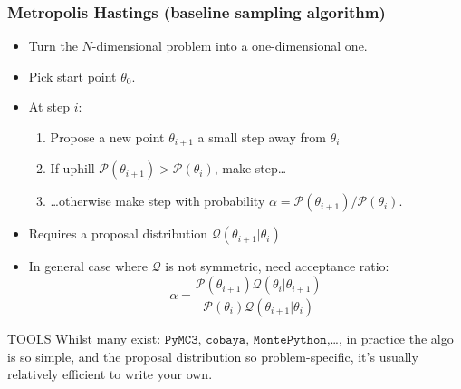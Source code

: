 \documentclass[aspectratio=169]{beamer}
\begin{document}
\begin{frame}
    \frametitle{Metropolis Hastings (baseline sampling algorithm)} 
    \begin{itemize}
        \item Turn the $N$-dimensional problem into a one-dimensional one.
        \item Pick start point $\theta_0$.
        \item At step $i$:
            \begin{enumerate}
                \item Propose a new point $\theta_{i+1}$ a small step away from $\theta_{i}$
                \item If uphill $\mathcal{P}(\theta_{i+1}) > \mathcal{P}(\theta_i)$, make step\ldots
                \item \ldots otherwise make step with probability $\alpha = \mathcal{P}(\theta_{i+1}) / \mathcal{P}(\theta_i)$. 
            \end{enumerate}
        \item Requires a proposal distribution $\mathcal{Q}(\theta_{i+1}|\theta_i)$
        \item In general case where $\mathcal{Q}$ is not symmetric, need acceptance ratio:
            \begin{equation*}
                \alpha = \frac{\mathcal{P}(\theta_{i+1})\mathcal{Q}(\theta_{i}|\theta_{i+1})}{\mathcal{P}(\theta_{i})\mathcal{Q}(\theta_{i+1}|\theta_{i})}
            \end{equation*}
    \end{itemize}
    \begin{block}{TOOLS}
        Whilst many exist: $\texttt{PyMC3}$, $\texttt{cobaya}$, $\texttt{MontePython}$,\ldots, in practice the algo is so simple, and the proposal distribution so problem-specific, it's usually relatively efficient to write your own.
    \end{block}
\end{frame}
\end{document}
